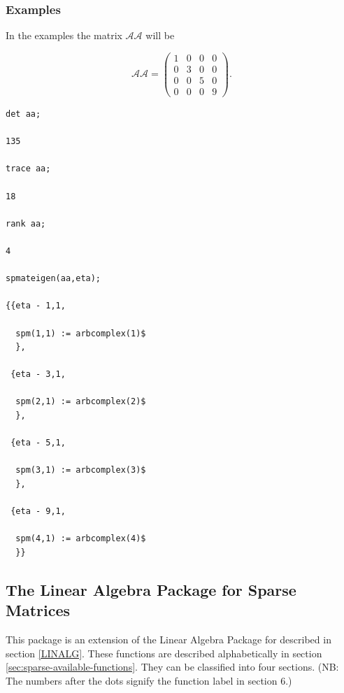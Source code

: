 \subsubsection{Examples}
In the examples the matrix $\mathcal{AA}$ will be

\[
\mathcal{AA} = \left( \begin{array}{cccc} 1 & 0 & 0 & 0 \\ 0 & 3 & 0 & 0 \\
0 & 0 & 5 & 0 \\ 0 & 0 & 0 & 9
\end{array} \right).
\]

\begin{verbatim}
det aa;

135

trace aa;

18

rank aa;

4

spmateigen(aa,eta);

{{eta - 1,1,

  spm(1,1) := arbcomplex(1)$
  },

 {eta - 3,1,

  spm(2,1) := arbcomplex(2)$
  },

 {eta - 5,1,

  spm(3,1) := arbcomplex(3)$
  },

 {eta - 9,1,

  spm(4,1) := arbcomplex(4)$
  }}
\end{verbatim}

\subsection{The Linear Algebra Package for Sparse Matrices}
This package is an extension of the Linear Algebra Package for \REDUCE{}
described in section \ref{LINALG}.
These functions are described
alphabetically in section \ref{sec:sparse-available-functions}.
They can be classified into four sections.  (NB: The numbers after
the dots signify the function label in section 6.)
